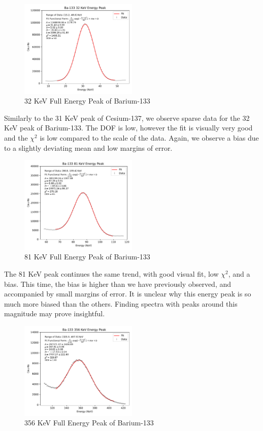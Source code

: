 \documentclass[12pt, letterpaper]{article}
\begin{document}
\begin{figure}[!h]
    \centering
    \includegraphics[width=0.5\textwidth]{experiment1/figures/ba133/peak-32.pdf}
    \caption{32 KeV Full Energy Peak of Barium-133}
    \label{fig:ba133-32}
\end{figure}

Similarly to the 31 KeV peak of Cesium-137, we observe sparse data for the 32 KeV peak of Barium-133. The DOF is low, however the fit is visually very good and the $\chi^2$ is low compared to the scale of the data. Again, we observe a bias due to a slightly deviating mean and low margins of error. 

\begin{figure}[!h]
    \centering
    \includegraphics[width=0.5\textwidth]{experiment1/figures/ba133/peak-81.pdf}
    \caption{81 KeV Full Energy Peak of Barium-133}
    \label{fig:ba133-81}
\end{figure}

The 81 KeV peak continues the same trend, with good visual fit, low $\chi^2$, and a bias. This time, the bias is higher than we have previously observed, and accompanied by small margins of error. It is unclear why this energy peak is so much more biased than the others. Finding spectra with peaks around this magnitude may prove insightful. 

\begin{figure}[!h]
    \centering
    \includegraphics[width=0.5\textwidth]{experiment1/figures/ba133/peak-356.pdf}
    \caption{356 KeV Full Energy Peak of Barium-133}
    \label{fig:ba133-356}
\end{figure}
\end{document}
